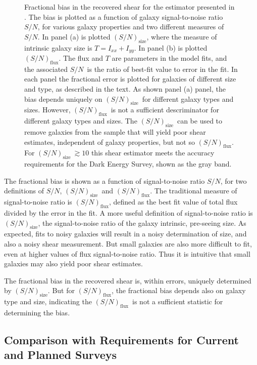 \documentclass[12pt,preprint]{aastex}
\newcommand{\sn}{$S/N$}
\newcommand{\Tsn}{$(S/N)_{\textrm{size}}$}
\newcommand{\fsn}{$(S/N)_{\textrm{flux}}$}
\begin{document}
\begin{figure}[p]
 \caption{ Fractional bias in the recovered shear for the estimator presented
     in \cite{ba14}.  The bias is plotted as a
     function of galaxy signal-to-noise ratio \sn, for various galaxy
     properties and two different measures of \sn.  In panel (a) is
     plotted \Tsn, where the measure of intrinsic galaxy size is $T=I_{xx} + I_{yy}$.  In 
     panel (b) is plotted \fsn.  The flux and $T$ are parameters in the model
     fits, and the associated \sn\ is the ratio of best-fit value to error in
     the fit.  In each panel the fractional error is plotted for galaxies of
     different size and type, as described in the text.  As shown panel (a)
     panel, the bias depends uniquely on \Tsn\ for different galaxy types and
     sizes.  However, \fsn\ is not a sufficient descriminator for different
     galaxy types and sizes.  The \Tsn\ can be used to remove galaxies from the
     sample that will yield poor shear estimates, independent of galaxy
     properties, but not so \fsn.  For \Tsn$~ \gtrsim 10$ this shear estimator meets
 the accuracy requirements for the Dark Energy Survey, shown as the gray band.
 \label{fig:fracerr}}

\end{figure}

The fractional bias is shown as a function of signal-to-noise ratio \sn,
for two definitions of \sn, \Tsn\ and \fsn.  The traditional measure of
signal-to-noise ratio is \fsn, defined as the best fit value of total flux
divided by the error in the fit.  A more useful definition of signal-to-noise
ratio is \Tsn, the signal-to-noise ratio of the galaxy intrinsic, pre-seeing
size.  As expected, fits to noisy galaxies will result in a noisy determination
of size, and also a noisy shear measurement. But small galaxies are also more
difficult to fit, even at higher values of flux signal-to-noise ratio.  Thus it
is intuitive that small galaxies may also yield poor shear estimates.

The fractional bias in the recovered shear is, within errors, uniquely
determined by \Tsn.  But for \fsn, the fractional bias depends also on galaxy
type and size, indicating the \fsn\ is not a sufficient statistic for
determining the bias.


\subsection{Comparison with Requirements for Current and Planned Surveys}
\label{sec:req}
\end{document}
